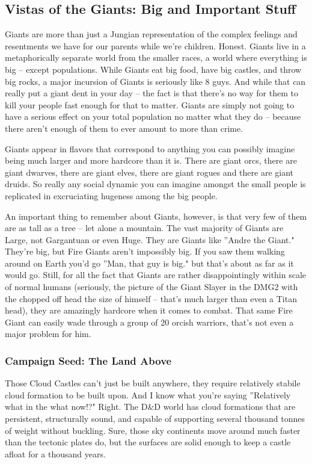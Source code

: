 \subsection{Vistas of the Giants: Big and Important Stuff}

Giants are more than just a Jungian representation of the complex feelings and resentments we have for our parents while we're children. Honest. Giants live in a metaphorically separate world from the smaller races, a world where everything is big -- except populations. While Giants eat big food, have big castles, and throw big rocks, a major incursion of Giants is seriously like 8 guys. And while that can really put a giant dent in your day -- the fact is that there's no way for them to kill your people fast enough for that to matter. Giants are simply not going to have a serious effect on your total population no matter what they do -- because there aren't enough of them to ever amount to more than crime.

Giants appear in flavors that correspond to anything you can possibly imagine being much larger and more hardcore than it is. There are giant orcs, there are giant dwarves, there are giant elves, there are giant rogues and there are giant druids. So really any social dynamic you can imagine amongst the small people is replicated in excruciating hugeness among the big people.

An important thing to remember about Giants, however, is that very few of them are as tall as a tree -- let alone a mountain. The vast majority of Giants are Large, not Gargantuan or even Huge. They are Giants like ''Andre the Giant." They're big, but Fire Giants aren't impossibly big. If you saw them walking around on Earth you'd go ''Man, that guy is big." but that's about as far as it would go. Still, for all the fact that Giants are rather disappointingly within scale of normal humans (seriously, the picture of the Giant Slayer in the DMG2 with the chopped off head the size of himself -- that's much larger than even a Titan head), they are amazingly hardcore when it comes to combat. That same Fire Giant can easily wade through a group of 20 orcish warriors, that's not even a major problem for him.

\subsubsection{Campaign Seed: The Land Above}
Those Cloud Castles can't just be built anywhere, they require relatively stabile cloud formation to be built upon. And I know what you're saying ''Relatively what in the what now!?" Right. The D\&D world has cloud formations that are persistent, structurally sound, and capable of supporting several thousand tonnes of weight without buckling. Sure, those sky continents move around much faster than the tectonic plates do, but the surfaces are solid enough to keep a castle afloat for a thousand years.

